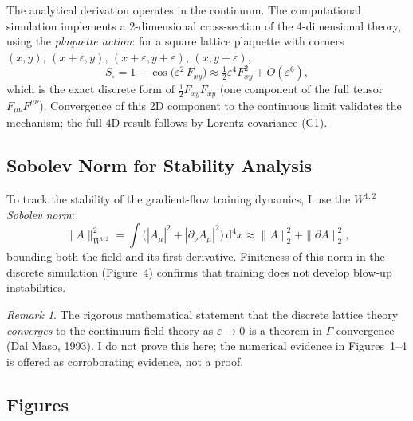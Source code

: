 \documentclass[12pt, a4paper]{article}
\theoremstyle{plain}
\theoremstyle{definition}
\theoremstyle{remark}
\newtheorem{remark}[theorem]{Remark}
\newcommand{\eps}{\varepsilon}
\renewcommand{\d}{\mathrm{d}}
\begin{document}
The analytical derivation operates in the continuum.  The computational simulation implements a 2-dimensional cross-section of the 4-dimensional theory, using the \emph{plaquette action}: for a square lattice plaquette with corners $(x,y),\,(x{+}\eps,y),\,(x{+}\eps,y{+}\eps),\,(x,y{+}\eps)$,
\begin{equation}
  S_{\square} = 1 - \cos\bigl(\eps^2\,F_{xy}\bigr) \approx \tfrac{1}{2}\eps^4 F_{xy}^2 + O(\eps^6),
  \label{eq:plaquette}
\end{equation}
which is the exact discrete form of $\tfrac{1}{2}F_{xy}F_{xy}$ (one component of the full tensor $F_{\mu\nu}F^{\mu\nu}$).  Convergence of this 2D component to the continuous limit validates the mechanism; the full 4D result follows by Lorentz covariance (C1).

\subsection{Sobolev Norm for Stability Analysis}

To track the stability of the gradient-flow training dynamics, I use the $W^{1,2}$ \emph{Sobolev norm}:
\begin{equation}
  \|A\|_{W^{1,2}}^2
  = \int \bigl(|A_\mu|^2 + |\partial_\nu A_\mu|^2\bigr)\,\d^4x
  \approx \|A\|_2^2 + \|\partial A\|_2^2,
  \label{eq:sobolev}
\end{equation}
bounding both the field and its first derivative.  Finiteness of this norm in the discrete simulation (Figure~4) confirms that training does not develop blow-up instabilities.

\begin{remark}
  The rigorous mathematical statement that the discrete lattice theory \emph{converges} to the continuum field theory as $\eps\to 0$ is a theorem in $\Gamma$-convergence (Dal Maso, 1993).  I do not prove this here; the numerical evidence in Figures~1–4 is offered as corroborating evidence, not a proof.
\end{remark}

\subsection{Figures}
\end{document}
